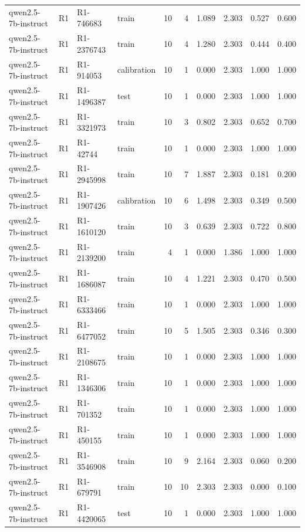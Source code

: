 \begin{table}
\begin{tabular}{llllrrrrrr}
qwen2.5-7b-instruct & R1 & R1-746683 & train & 10 & 4 & 1.089 & 2.303 & 0.527 & 0.600 \\
qwen2.5-7b-instruct & R1 & R1-2376743 & train & 10 & 4 & 1.280 & 2.303 & 0.444 & 0.400 \\
qwen2.5-7b-instruct & R1 & R1-914053 & calibration & 10 & 1 & 0.000 & 2.303 & 1.000 & 1.000 \\
qwen2.5-7b-instruct & R1 & R1-1496387 & test & 10 & 1 & 0.000 & 2.303 & 1.000 & 1.000 \\
qwen2.5-7b-instruct & R1 & R1-3321973 & train & 10 & 3 & 0.802 & 2.303 & 0.652 & 0.700 \\
qwen2.5-7b-instruct & R1 & R1-42744 & train & 10 & 1 & 0.000 & 2.303 & 1.000 & 1.000 \\
qwen2.5-7b-instruct & R1 & R1-2945998 & train & 10 & 7 & 1.887 & 2.303 & 0.181 & 0.200 \\
qwen2.5-7b-instruct & R1 & R1-1907426 & calibration & 10 & 6 & 1.498 & 2.303 & 0.349 & 0.500 \\
qwen2.5-7b-instruct & R1 & R1-1610120 & train & 10 & 3 & 0.639 & 2.303 & 0.722 & 0.800 \\
qwen2.5-7b-instruct & R1 & R1-2139200 & train & 4 & 1 & 0.000 & 1.386 & 1.000 & 1.000 \\
qwen2.5-7b-instruct & R1 & R1-1686087 & train & 10 & 4 & 1.221 & 2.303 & 0.470 & 0.500 \\
qwen2.5-7b-instruct & R1 & R1-6333466 & train & 10 & 1 & 0.000 & 2.303 & 1.000 & 1.000 \\
qwen2.5-7b-instruct & R1 & R1-6477052 & train & 10 & 5 & 1.505 & 2.303 & 0.346 & 0.300 \\
qwen2.5-7b-instruct & R1 & R1-2108675 & train & 10 & 1 & 0.000 & 2.303 & 1.000 & 1.000 \\
qwen2.5-7b-instruct & R1 & R1-1346306 & train & 10 & 1 & 0.000 & 2.303 & 1.000 & 1.000 \\
qwen2.5-7b-instruct & R1 & R1-701352 & train & 10 & 1 & 0.000 & 2.303 & 1.000 & 1.000 \\
qwen2.5-7b-instruct & R1 & R1-450155 & train & 10 & 1 & 0.000 & 2.303 & 1.000 & 1.000 \\
qwen2.5-7b-instruct & R1 & R1-3546908 & train & 10 & 9 & 2.164 & 2.303 & 0.060 & 0.200 \\
qwen2.5-7b-instruct & R1 & R1-679791 & train & 10 & 10 & 2.303 & 2.303 & 0.000 & 0.100 \\
qwen2.5-7b-instruct & R1 & R1-4420065 & test & 10 & 1 & 0.000 & 2.303 & 1.000 & 1.000 \\

\end{tabular}
\end{table}
